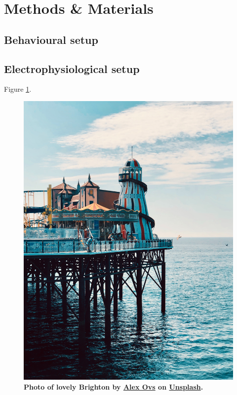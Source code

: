 \section{Methods \& Materials} \label{methods}

\subsection{Behavioural setup}
\lipsum[2]

\subsection{Electrophysiological setup}
\lipsum[2] Figure \ref{fig:setup}.

\begin{figure}
    \centering
    \includegraphics[width=\hsize]{figures/brighton.jpeg}
    \caption{
        \textbf{Photo of lovely Brighton by \href{https://unsplash.com/es/@sanekovs?utm_source=unsplash&utm_medium=referral&utm_content=creditCopyText"}{Alex Ovs} on \href{https://unsplash.com/s/photos/brighton?utm_source=unsplash&utm_medium=referral&utm_content=creditCopyText}{Unsplash}.
        }
        \lipsum[1]
    }
    \label{fig:setup}
\end{figure}



